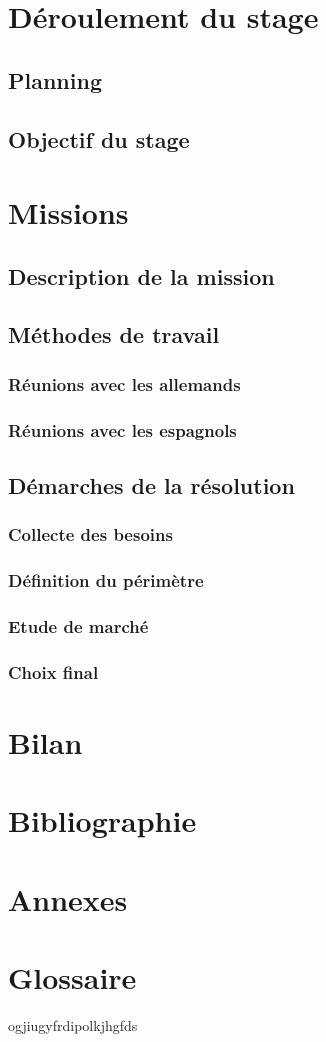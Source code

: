 \documentclass[12pt]{article}
\begin{document}
\section{Déroulement du stage}
	\subsection{Planning}
	\subsection{Objectif du stage}
	
\section{Missions}
	\subsection{Description de la mission}
	\subsection{Méthodes de travail}
		\subsubsection{Réunions avec les allemands}
		\subsubsection{Réunions avec les espagnols}
	\subsection{Démarches de la résolution}
		\subsubsection{Collecte des besoins}
		\subsubsection{Définition du périmètre}
		\subsubsection{Etude de marché}	
		\subsubsection{Choix final}
		
\section{Bilan}
\section{Bibliographie}
\section{Annexes}
\section{Glossaire}

ogjiugyfrdipolkjhgfds

%
%
\end{document}
